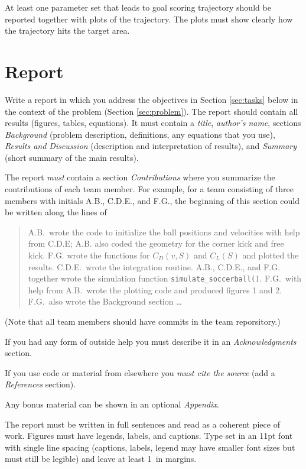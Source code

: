 \documentclass[letterpaper]{scrartcl}
\begin{document}
At least one parameter set that leads to goal scoring trajectory
should be reported together with plots of the trajectory. The plots
must show clearly how the trajectory hits the target area.

\section{Report}
\label{sec:report}

Write a report in which you address the objectives in Section
\ref{sec:tasks} below in the context of the problem (Section
\ref{sec:problem}). The report should contain all results (figures,
tables, equations). It must contain a \emph{title}, \emph{author's
  name}, sections \emph{Background} (problem description, definitions,
any equations that you use), \emph{Results and Discussion}
(description and interpretation of results), and \emph{Summary} (short
summary of the main results).

The report \emph{must} contain a section \emph{Contributions} where
you summarize the contributions of each team member. For example, for
a team consisting of three members with initials A.B., C.D.E., and
F.G., the beginning of this section could be written along the lines
of
\begin{quotation}
  A.B.\ wrote the code to initialize the ball positions and velocities
  with help from C.D.E; A.B. also coded the geometry for the corner
  kick and free kick. F.G. wrote the functions for $C_{D}(v, S)$ and
  $C_{L}(S)$ and plotted the results. C.D.E.\ wrote the integration
  routine. A.B., C.D.E., and F.G. together wrote the simulation
  function \texttt{simulate\_soccerball()}. F.G.\ with help from A.B.\
  wrote the plotting code and produced figures 1 and 2. F.G.\
  also wrote the Background section \dots
\end{quotation}
(Note that all team members should have commits in the team
reporsitory.)

If you had any form of outside help you must describe it in an
\emph{Acknowledgments} section. 

If you use code or material from elsewhere you \emph{must cite the
  source} (add a \emph{References} section). 

Any bonus material can be shown in an optional \emph{Appendix}.

The report must be written in full sentences and read as a coherent
piece of work. Figures must have legends, labels, and captions. Type
set in an 11pt font with single line spacing (captions, labels, legend
may have smaller font sizes but must still be legible) and leave at
least 1~in margins. 
\end{document}
